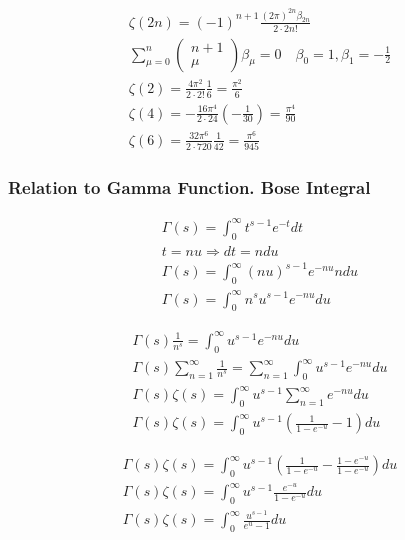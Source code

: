 	$$
	\begin{gathered}
		\zeta(2 n)=(-1)^{n+1} \frac{(2 \pi)^{2 n} \beta_{2 n}}{2 \cdot 2 n !} \\
		\sum_{\mu=0}^n\left(\begin{array}{c}
			n+1 \\
			\mu
		\end{array}\right) \beta_\mu=0 \quad \beta_0=1, \beta_1=-\frac{1}{2} \\
		\zeta(2)=\frac{4 \pi^2}{2 \cdot 2 !} \frac{1}{6}=\frac{\pi^2}{6} \\
		\zeta(4)=-\frac{16 \pi^4}{2 \cdot 24}\left(-\frac{1}{30}\right)=\frac{\pi^4}{90} \\
		\zeta(6)=\frac{32 \pi^6}{2 \cdot 720} \frac{1}{42}=\frac{\pi^6}{945}
	\end{gathered}
	$$
	
	\subsubsection{Relation to Gamma Function. Bose Integral}
	
	$$
	\begin{gathered}
		\Gamma(s)=\int_0^{\infty} t^{s-1} e^{-t} d t \\
		t=n u \Rightarrow d t=n d u \\
		\Gamma(s)=\int_0^{\infty}(n u)^{s-1} e^{-n u} n d u \\
		\Gamma(s)=\int_0^{\infty} n^s u^{s-1} e^{-n u} d u
	\end{gathered}
	$$
	
	$$
	\begin{gathered}
		\Gamma(s) \frac{1}{n^s}=\int_0^{\infty} u^{s-1} e^{-n u} d u \\
		\Gamma(s) \sum_{n=1}^{\infty} \frac{1}{n^s}=\sum_{n=1}^{\infty} \int_0^{\infty} u^{s-1} e^{-n u} d u \\
		\Gamma(s) \zeta(s)=\int_0^{\infty} u^{s-1} \sum_{n=1}^{\infty} e^{-n u} d u \\
		\Gamma(s) \zeta(s)=\int_0^{\infty} u^{s-1}\left(\frac{1}{1-e^{-u}}-1\right) d u
	\end{gathered}
	$$
	
	$$
	\begin{gathered}
		\Gamma(s) \zeta(s)=\int_0^{\infty} u^{s-1}\left(\frac{1}{1-e^{-u}}-\frac{1-e^{-u}}{1-e^{-u}}\right) d u \\
		\Gamma(s) \zeta(s)=\int_0^{\infty} u^{s-1} \frac{e^{-u}}{1-e^{-u}} d u \\
		\Gamma(s) \zeta(s)=\int_0^{\infty} \frac{u^{s-1}}{e^u-1} d u
	\end{gathered}
	$$

